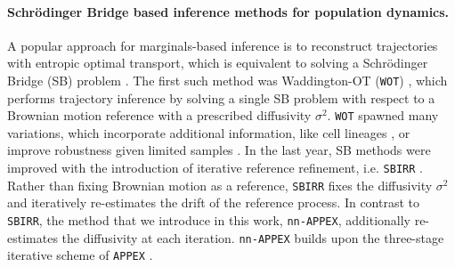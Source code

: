 \documentclass[twoside]{article}
\newcommand{\rv}[1]{\textcolor{red}{#1}}
\newcommand{\nappex}{\texttt{nn-APPEX}}
\newcommand{\appex}{\texttt{APPEX}}
\newcommand{\wot}{\texttt{WOT}}
\newcommand{\sbirr}{\texttt{SBIRR}}
\begin{document}
\paragraph{Schr\"odinger Bridge based inference methods for population dynamics.} 
A popular approach for marginals-based inference is to reconstruct trajectories with entropic optimal transport, which is equivalent to solving a Schr\"odinger Bridge (SB) problem \citep[Prop. 4.2]{peyre2019computational}. The first such method was Waddington-OT (\wot) \citep{schiebinger2019optimal}, which performs trajectory inference by solving a single SB problem with respect to a Brownian motion reference with a prescribed diffusivity $\sigma^2$. \wot{} spawned many variations, which incorporate additional information, like cell lineages \citep{forrow2021lineageot,ventre2023trajectory}, or improve robustness given limited samples \citep{zhang2021optimal,lavenant2021towards,chizat2022trajectory}. In the last year, SB methods were improved with the introduction of iterative reference refinement, i.e. \sbirr{} \citep{shen2025multi, zhang2024joint}. Rather than fixing Brownian motion as a reference, \sbirr{} fixes the diffusivity $\sigma^2$ and iteratively re-estimates the drift of the reference process. In contrast to \sbirr, the method that we introduce in this work, \nappex, additionally re-estimates the diffusivity at each iteration. \nappex{} builds upon the three-stage iterative scheme of \appex{} \citep{guan2024identifying}.


\end{document}
